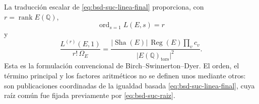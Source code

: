 La traducción escalar de \eqref{eq:bsd-suc-linea-final} proporciona, con
\(r=\operatorname{rank}E(\mathbb Q)\),
\begin{equation}\label{eq:bsd-suc-rango-final}
 \operatorname{ord}_{s=1}L(E,s)=r
\end{equation}
y
\begin{equation}\label{eq:bsd-suc-formula-final}
 \frac{L^{(r)}(E,1)}{r!\,\Omega_E}
 =\frac{
   \lvert\operatorname{Sha}(E)\rvert\,\operatorname{Reg}(E)\prod_v c_v}
  {\lvert E(\mathbb Q)_{\mathrm{tors}}\rvert^2}.
\end{equation}
Esta es la formulación convencional de Birch--Swinnerton--Dyer. El orden,
el término principal y los factores aritméticos no se definen unos mediante
otros: son publicaciones coordinadas de la igualdad basada
\eqref{eq:bsd-suc-linea-final}, cuya raíz común fue fijada previamente por
\eqref{eq:bsd-suc-raiz}.
